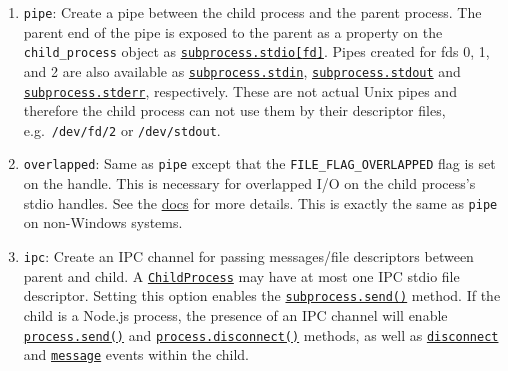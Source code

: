 \begin{enumerate}
\def\labelenumi{\arabic{enumi}.}
\item
  \texttt{\textquotesingle{}pipe\textquotesingle{}}: Create a pipe
  between the child process and the parent process. The parent end of
  the pipe is exposed to the parent as a property on the
  \texttt{child\_process} object as
  \hyperref[subprocessstdio]{\texttt{subprocess.stdio{[}fd{]}}}. Pipes
  created for fds 0, 1, and 2 are also available as
  \hyperref[subprocessstdin]{\texttt{subprocess.stdin}},
  \hyperref[subprocessstdout]{\texttt{subprocess.stdout}} and
  \hyperref[subprocessstderr]{\texttt{subprocess.stderr}}, respectively.
  These are not actual Unix pipes and therefore the child process can
  not use them by their descriptor files, e.g.~\texttt{/dev/fd/2} or
  \texttt{/dev/stdout}.
\item
  \texttt{\textquotesingle{}overlapped\textquotesingle{}}: Same as
  \texttt{\textquotesingle{}pipe\textquotesingle{}} except that the
  \texttt{FILE\_FLAG\_OVERLAPPED} flag is set on the handle. This is
  necessary for overlapped I/O on the child process's stdio handles. See
  the
  \href{https://docs.microsoft.com/en-us/windows/win32/fileio/synchronous-and-asynchronous-i-o}{docs}
  for more details. This is exactly the same as
  \texttt{\textquotesingle{}pipe\textquotesingle{}} on non-Windows
  systems.
\item
  \texttt{\textquotesingle{}ipc\textquotesingle{}}: Create an IPC
  channel for passing messages/file descriptors between parent and
  child. A \hyperref[class-childprocess]{\texttt{ChildProcess}} may have
  at most one IPC stdio file descriptor. Setting this option enables the
  \hyperref[subprocesssendmessage-sendhandle-options-callback]{\texttt{subprocess.send()}}
  method. If the child is a Node.js process, the presence of an IPC
  channel will enable
  \href{process.md\#processsendmessage-sendhandle-options-callback}{\texttt{process.send()}}
  and
  \href{process.md\#processdisconnect}{\texttt{process.disconnect()}}
  methods, as well as
  \href{process.md\#event-disconnect}{\texttt{\textquotesingle{}disconnect\textquotesingle{}}}
  and
  \href{process.md\#event-message}{\texttt{\textquotesingle{}message\textquotesingle{}}}
  events within the child.


\end{enumerate}
